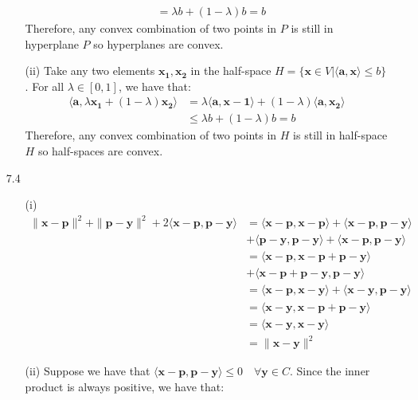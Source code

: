 \documentclass[letterpaper,12pt]{article}
\theoremstyle{definition}
\begin{document}
\begin{enumerate}
\begin{enumerate}
\begin{align*}
          &= \lambda b + (1-\lambda)b = b
        \end{align*}
        Therefore, any convex combination of two points in $P$ is still in hyperplane $P$ so hyperplanes are convex.
      \item[(ii)]
      Take any two elements $\mathbf{x_1},\mathbf{x_2}$ in the half-space $H = \{\mathbf{x}\in V|\langle\mathbf{a},\mathbf{x}\rangle\leq b\}$. For all $\lambda\in[0,1]$, we have that:
      \begin{align*}
        \langle\mathbf{a},\lambda\mathbf{x_1}+(1-\lambda)\mathbf{x_2}\rangle &= \lambda\langle\mathbf{a},\mathbf{x-1}\rangle + (1-\lambda)\langle\mathbf{a},\mathbf{x_2}\rangle \\
        &\leq \lambda b + (1-\lambda)b = b
      \end{align*}
      Therefore, any convex combination of two points in $H$ is still in half-space $H$ so half-spaces are convex.
    \end{enumerate}
  \item[7.4]
    \begin{enumerate}
      \item[(i)]
        \begin{align*}
          \|\mathbf{x}-\mathbf{p}\|^2+\|\mathbf{p}-\mathbf{y}\|^2 + 2\langle\mathbf{x}-\mathbf{p},\mathbf{p}-\mathbf{y}\rangle &= \langle\mathbf{x}-\mathbf{p},\mathbf{x}-\mathbf{p}\rangle + \langle\mathbf{x}-\mathbf{p},\mathbf{p}-\mathbf{y}\rangle \\
          &+ \langle\mathbf{p}-\mathbf{y},\mathbf{p}-\mathbf{y}\rangle + \langle\mathbf{x}-\mathbf{p},\mathbf{p}-\mathbf{y}\rangle \\
          &= \langle \mathbf{x}-\mathbf{p}, \mathbf{x}-\mathbf{p}+\mathbf{p}-\mathbf{y} \rangle \\
          &+ \langle \mathbf{x}-\mathbf{p} + \mathbf{p}-\mathbf{y}, \mathbf{p}-\mathbf{y} \rangle \\
          &= \langle \mathbf{x}-\mathbf{p}, \mathbf{x}-\mathbf{y} \rangle + \langle \mathbf{x}-\mathbf{y},\mathbf{p}-\mathbf{y} \rangle  \\
          &= \langle \mathbf{x}-\mathbf{y}, \mathbf{x}-\mathbf{p}+\mathbf{p}-\mathbf{y} \rangle \\
          &= \langle \mathbf{x}-\mathbf{y},\mathbf{x}-\mathbf{y}\rangle \\
          &= \|\mathbf{x}-\mathbf{y}\|^2
        \end{align*}
      \item[(ii)]
        Suppose we have that $\langle\mathbf{x}-\mathbf{p},\mathbf{p}-\mathbf{y}\rangle \leq 0 \quad\forall \mathbf{y}\in C$. Since the inner product is always positive, we have that:

\end{enumerate}
\end{enumerate}
\end{document}

